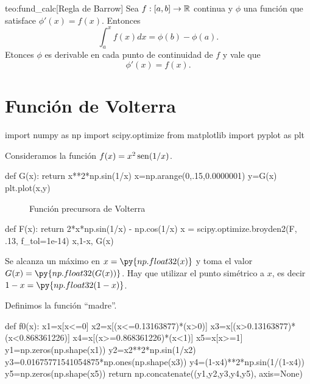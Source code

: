\begin{corolario}{teo:fund_calc}[Regla de Barrow]
 Sea $f:[a,b]\to\mathbb{R}$ continua y $\phi$ una función que satisface $\phi'(x)=f(x)$. Entonces
 \begin{equation}\label{eq:barrow}
  \int_a^{x}f(x)dx=\phi(b)-\phi(a).
 \end{equation}
Etonces $\phi$ es derivable en cada punto de continuidad de $f$ y vale que
 \begin{equation*}\label{eq:primi2}
  \phi'(x)=f(x).
 \end{equation*}
\end{corolario}


\section{Función de Volterra}

\begin{pyblock}
import numpy as np
import scipy.optimize
from matplotlib import pyplot as plt
\end{pyblock}

Consideramos  la función $f(x)=x^2\operatorname{sen}(1/x)$. 

\begin{pyblock}
def G(x):
    return x**2*np.sin(1/x)
x=np.arange(0,.15,0.0000001)
y=G(x)
plt.plot(x,y)
\end{pyblock}


 \begin{figure}[h]
 \begin{center}
 \caption{Función precursora de Volterra}
\end{center}
 \end{figure}





\begin{pyblock}
def F(x):
    return 2*x*np.sin(1/x) - np.cos(1/x)
x = scipy.optimize.broyden2(F, .13, f_tol=1e-14)
x,1-x, G(x)
\end{pyblock}

Se alcanza un máximo en $x=\py{np.float32(x)}$ y toma el valor $G(x)=\py{np.float32(G(x))}$. Hay que utilizar el punto simétrico a $x$, es decir $1-x=\py{np.float32(1-x)}$.


Definimos la función ``madre''.



\begin{pyblock}
def f0(x):
    x1=x[x<=0]
    x2=x[(x<=0.13163877)*(x>0)]
    x3=x[(x>0.13163877)*(x<0.868361226)]
    x4=x[(x>=0.868361226)*(x<1)]
    x5=x[x>=1]
    y1=np.zeros(np.shape(x1))
    y2=x2**2*np.sin(1/x2)
    y3=0.01675771541054875*np.ones(np.shape(x3))
    y4=(1-x4)**2*np.sin(1/(1-x4))
    y5=np.zeros(np.shape(x5))
    return np.concatenate((y1,y2,y3,y4,y5), axis=None)
\end{pyblock}

